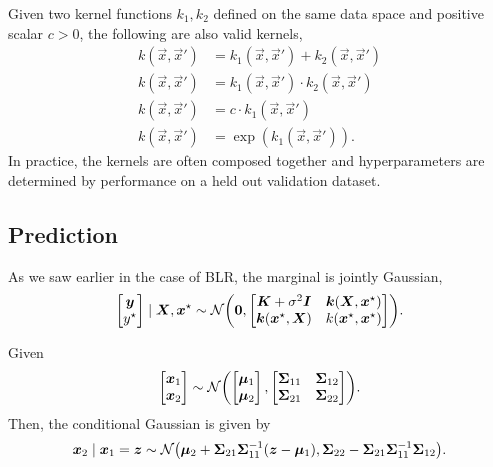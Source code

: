 Given two kernel functions $k_1, k_2$ defined on the same data space and positive scalar $c > 0$,
the following are also valid kernels,
\begin{align*}
    k(\vec{x}, \vec{x}') & = k_1(\vec{x}, \vec{x}') + k_2(\vec{x}, \vec{x}')     \\
    k(\vec{x}, \vec{x}') & = k_1(\vec{x}, \vec{x}') \cdot k_2(\vec{x}, \vec{x}') \\
    k(\vec{x}, \vec{x}') & = c \cdot k_1(\vec{x}, \vec{x}')                      \\
    k(\vec{x}, \vec{x}') & = \exp(k_1(\vec{x}, \vec{x}')).
\end{align*}
In practice, the kernels are often composed together and hyperparameters are determined by
performance on a held out validation dataset.

\subsection{Prediction}

As we saw earlier in the case of BLR, the marginal is jointly Gaussian, \[
    \begin{bmatrix} \vec{y} \\ y^\star \end{bmatrix} \mid \mat{X}, \vec{x}^\star \sim \mathcal{N}\lft(
    \vec{0},
    \begin{bmatrix}
        \mat{K} + \sigma^2 \mat{I}      & \vec{k}(\mat{X}, \vec{x}^\star) \\
        \vec{k}(\vec{x}^\star, \mat{X}) & k(\vec{x}^\star, \vec{x}^\star)
    \end{bmatrix} \rgt).
\]

\begin{theorem}
    Given \[
        \begin{bmatrix} \vec{x}_1 \\ \vec{x}_2 \end{bmatrix}
        \sim \mathcal{N} \lft(
        \begin{bmatrix} \vec{\mu}_1 \\ \vec{\mu}_2 \end{bmatrix},
        \begin{bmatrix}
                \mat{\Sigma}_{11} & \mat{\Sigma}_{12} \\
                \mat{\Sigma}_{21} & \mat{\Sigma}_{22}
            \end{bmatrix} \rgt).
    \]
    Then, the conditional Gaussian is given by \[
        \vec{x}_2 \mid \vec{x}_1 = \vec{z} \sim \mathcal{N}\lft( \vec{\mu}_2 + \mat{\Sigma}_{21} \inv{\mat{\Sigma}_{11}} (\vec{z} - \vec{\mu}_1), \mat{\Sigma}_{22} - \mat{\Sigma}_{21} \inv{\mat{\Sigma}_{11}} \mat{\Sigma}_{12} \rgt).
    \]
\end{theorem}

